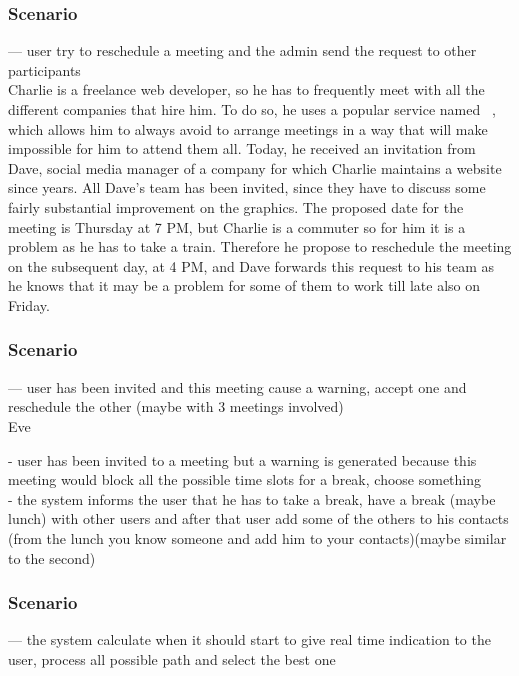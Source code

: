 \subsubsection{Scenario \thecountScenarios }
--- user try to reschedule a meeting and the admin send the request to other participants\\

Charlie is a freelance web developer, so he has to frequently meet with all the different companies that hire him. To do so, he uses a popular service named \projectname~, which allows him to always avoid to arrange meetings in a way that will make impossible for him to attend them all. Today, he received an invitation from Dave, social media manager of a company for which Charlie maintains a website since years. All Dave's team has been invited, since they have to discuss some fairly substantial improvement on the graphics. The proposed date for the meeting is Thursday at 7 PM, but Charlie is a commuter so for him it is a problem as he has to take a train. Therefore he propose to reschedule the meeting on the subsequent day, at 4 PM, and Dave forwards this request to his team as he knows that it may be a problem for some of them to work till late also on Friday.


\subsubsection{Scenario \thecountScenarios }
--- user has been invited and this meeting cause a warning, accept one and reschedule the other (maybe with 3 meetings involved)\\

Eve

- user has been invited to a meeting but a warning is generated because this meeting would block all the possible time slots for a break, choose something\\
- the system informs the user that he has to take a break, have a break (maybe lunch) with other users and after that user add some of the others to his contacts (from the lunch you know someone and add him to your contacts)(maybe similar to the second)\\


\subsubsection{Scenario \thecountScenarios }
--- the system calculate when it should start to give real time indication to the user, process all possible path and select the best one\\

